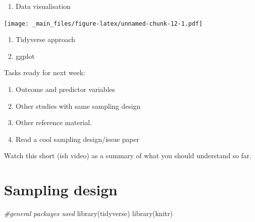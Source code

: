 \documentclass[
]{book}
\newenvironment{Shaded}{\begin{snugshade}}{\end{snugshade}}
\newcommand{\AttributeTok}[1]{\textcolor[rgb]{0.77,0.63,0.00}{#1}}
\newcommand{\CommentTok}[1]{\textcolor[rgb]{0.56,0.35,0.01}{\textit{#1}}}
\newcommand{\ConstantTok}[1]{\textcolor[rgb]{0.00,0.00,0.00}{#1}}
\newcommand{\FunctionTok}[1]{\textcolor[rgb]{0.00,0.00,0.00}{#1}}
\newcommand{\NormalTok}[1]{#1}
\newcommand{\SpecialCharTok}[1]{\textcolor[rgb]{0.00,0.00,0.00}{#1}}
\providecommand{\tightlist}{%
  \setlength{\itemsep}{0pt}\setlength{\parskip}{0pt}}
\begin{document}
\begin{enumerate}
\def\labelenumi{\arabic{enumi}.}
\setcounter{enumi}{3}
\tightlist
\item
  Data visualisation
\end{enumerate}

\begin{Shaded}
\end{Shaded}

\texttt{[image: \_main\_files/figure-latex/unnamed-chunk-12-1.pdf]}

\begin{enumerate}
\def\labelenumi{\arabic{enumi}.}
\setcounter{enumi}{4}
\item
  Tidyverse approach
\item
  ggplot
\end{enumerate}

Tasks ready for next week:

\begin{enumerate}
\def\labelenumi{\arabic{enumi}.}
\item
  Outcome and predictor variables
\item
  Other studies with same sampling design
\item
  Other reference material.
\item
  Read a cool sampling design/issue paper
\end{enumerate}

Watch this short (ish video) as a summary of what you should understand so far.

\hypertarget{sampling-design}{%
\chapter{Sampling design}\label{sampling-design}}

\begin{Shaded}
\begin{Highlighting}[]
\CommentTok{\#general packages used}
\FunctionTok{library}\NormalTok{(tidyverse)}
\FunctionTok{library}\NormalTok{(knitr)}
\end{Highlighting}
\end{Shaded}
\end{document}
